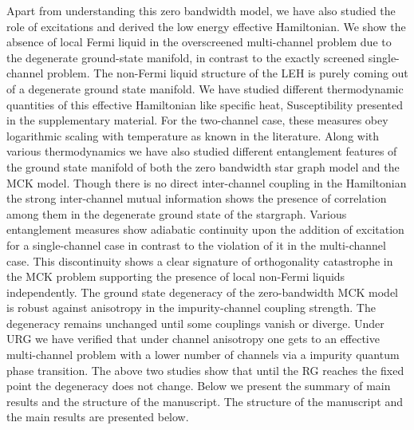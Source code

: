 \documentclass[reprint,prb,superscriptaddress]{revtex4-2}
\begin{document}
\par Apart from understanding this zero bandwidth model, we have also studied the role of excitations and derived the low energy effective Hamiltonian. We show the absence of local Fermi liquid in the overscreened multi-channel problem due to the degenerate ground-state manifold, in contrast to the exactly screened single-channel problem. The non-Fermi liquid structure of the LEH is purely coming out of a degenerate ground state manifold. We have studied different thermodynamic quantities of this effective Hamiltonian like specific heat, Susceptibility presented in the supplementary material. For the two-channel case, these measures obey logarithmic scaling with temperature as known in the literature. Along with various thermodynamics we have also studied different entanglement features of the ground state manifold of both the zero bandwidth star graph model and the MCK model. Though there is no direct inter-channel coupling in the Hamiltonian the strong inter-channel mutual information shows the presence of correlation among them in the degenerate ground state of the stargraph. Various entanglement measures show adiabatic continuity upon the addition of excitation for a single-channel case in contrast to the violation of it in the multi-channel case. This discontinuity shows a clear signature of orthogonality catastrophe in the MCK problem supporting the presence of local non-Fermi liquids independently. The ground state degeneracy of the zero-bandwidth MCK model is robust against anisotropy in the impurity-channel coupling strength. The degeneracy remains unchanged until some couplings vanish or diverge. Under URG we have verified that under channel anisotropy one gets to an effective multi-channel problem with a lower number of channels via a impurity quantum phase transition. The above two studies show that until the RG reaches the fixed point the degeneracy does not change. Below we present the summary of main results and the structure of the manuscript. The structure of the manuscript and the main results are presented below.
\end{document}
